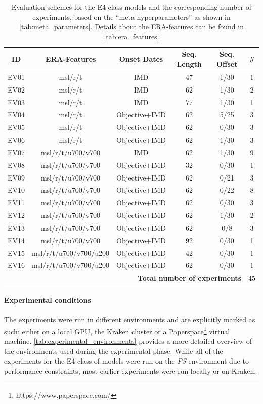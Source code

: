 \begin{table}[h]
  \centering
  \begin{tabular}{cccccc}
    \toprule
    \textbf{ID} & \textbf{ERA-Features} & \textbf{Onset Dates} & \textbf{Seq. Length} & \textbf{Seq. Offset}  & \textbf{\#} \\
    \midrule
    EV01 & msl/r/t & IMD & 47 & 1/30 & 1 \\
    EV02 & msl/r/t & IMD & 62 & 1/30 & 2 \\
    EV03 & msl/r/t & IMD & 77 & 1/30 & 1 \\
    EV04 & msl/r/t & Objective+IMD & 62 & 5/25 & 3 \\
    EV05 & msl/r/t & Objective+IMD & 62 & 0/30 & 3 \\
    EV06 & msl/r/t & Objective+IMD & 62 & 1/30 & 3 \\
    EV07 & msl/r/t/u700/v700 & IMD & 62 & 1/30 & 9 \\
    EV08 & msl/r/t/u700/v700 & Objective+IMD & 32 & 0/30 & 1 \\
    EV09 & msl/r/t/u700/v700 & Objective+IMD & 62 & 0/21 & 3 \\
    EV10 & msl/r/t/u700/v700 & Objective+IMD & 62 & 0/22 & 8 \\
    EV11 & msl/r/t/u700/v700 & Objective+IMD & 62 & 0/30 & 3 \\
    EV12 & msl/r/t/u700/v700 & Objective+IMD & 62 & 1/30 & 2 \\
    EV13 & msl/r/t/u700/v700 & Objective+IMD & 62 & 0/8 & 3 \\
    EV14 & msl/r/t/u700/v700 & Objective+IMD & 92 & 0/30 & 1 \\
    EV15 & msl/r/t/u700/v700/u200 & Objective+IMD & 42 & 0/30 & 1 \\
    EV16 & msl/r/t/u700/v700/u200 & Objective+IMD & 62 & 0/30 & 1 \\
    \midrule
    \multicolumn{5}{r}{\textbf{Total number of experiments}} & 45 \\
    \bottomrule
  \end{tabular}
  \caption{Evaluation schemes for the E4-class models and the corresponding number of experiments, based on the ``meta-hyperparameters'' as shown in \cref{tab:meta_parameters}. Details about the ERA-features can be found in \cref{tab:era_features}}
  \label{tab:evaluation_schemes}
\end{table}

\paragraph{Experimental conditions}
The experiments were run in different environments and are explicitly marked as such: either on a local GPU, the Kraken cluster or a Paperspace\footnote{https://www.paperspace.com/} virtual machine. \cref{tab:experimental_environments} provides a more detailed overview of the environments used during the experimental phase. While all of the experiments for the E4-class of models were run on the \textit{PS} environment due to performance constraints, most earlier experiments were run locally or on Kraken.

